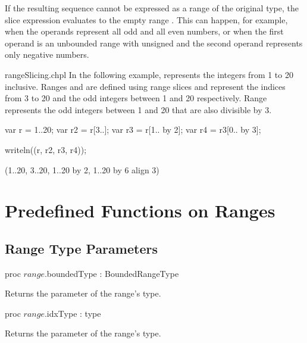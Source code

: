 If the resulting sequence cannot be expressed as a range of the
original type, the slice expression evaluates to the empty
range . This can happen, for example, when the operands
represent all odd and all even numbers, or when the first operand is
an unbounded range with unsigned  and the second operand
represents only negative numbers.

\begin{chapelexample}{rangeSlicing.chpl}
In the following example,  represents the integers from 1 to
20 inclusive.  Ranges  and  are defined using range
slices and represent the indices from 3 to 20 and the odd integers
between 1 and 20 respectively. Range  represents the odd
integers between 1 and 20 that are also divisible by 3.
\begin{chapel}
var r = 1..20;
var r2 = r[3..];
var r3 = r[1.. by 2];
var r4 = r3[0.. by 3];
\end{chapel}
\begin{chapelpost}
writeln((r, r2, r3, r4));
\end{chapelpost}
\begin{chapeloutput}
(1..20, 3..20, 1..20 by 2, 1..20 by 6 align 3)
\end{chapeloutput}
\end{chapelexample}


\section{Predefined Functions on Ranges}
\label{Predefined_Range_Functions}

\subsection{Range Type Parameters}
\label{Range_Type_Accessors}

\begin{protohead}
proc $range$.boundedType : BoundedRangeType
\end{protohead}
\begin{protobody}
Returns the  parameter of the range's type.
\end{protobody}

\begin{protohead}
proc $range$.idxType : type
\end{protohead}
\begin{protobody}
Returns the  parameter of the range's type.
\end{protobody}

